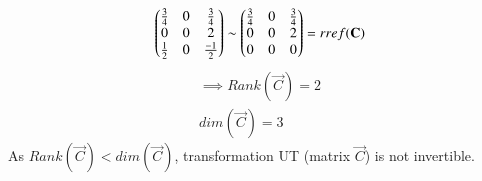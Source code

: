 \documentclass[journal,12pt,twocolumn]{IEEEtran}
\begin{document}
\begin{enumerate}
\begin{align}
\begin{pmatrix}\frac{3}{4}&0&\frac{3}{4}\\0&0&2\\\frac{1}{2}&0&\frac{-1}{2}\end{pmatrix} \sim \begin{pmatrix}\frac{3}{4}&0&\frac{3}{4}\\0&0&2\\0&0&0\end{pmatrix}=rref(\mathbf{C})
\end{align}
\begin{align}
\implies Rank(\vec{C})=2 \label{RankC}\\
dim(\vec{C})=3
\end{align}
As $Rank(\vec{C})<dim(\vec{C})$, transformation UT (matrix $\vec{C}$) is not invertible.
\end{enumerate}
\end{document}
